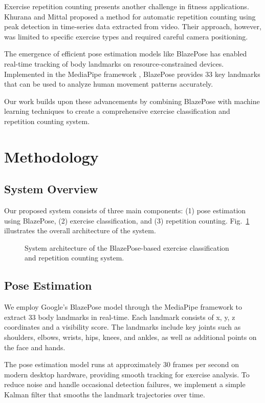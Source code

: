 \documentclass[conference]{IEEEtran}
\begin{document}
Exercise repetition counting presents another challenge in fitness applications. Khurana and Mittal \cite{rep_counting} proposed a method for automatic repetition counting using peak detection in time-series data extracted from video. Their approach, however, was limited to specific exercise types and required careful camera positioning.

The emergence of efficient pose estimation models like BlazePose \cite{blazepose} has enabled real-time tracking of body landmarks on resource-constrained devices. Implemented in the MediaPipe framework \cite{mediapipe}, BlazePose provides 33 key landmarks that can be used to analyze human movement patterns accurately.

Our work builds upon these advancements by combining BlazePose with machine learning techniques to create a comprehensive exercise classification and repetition counting system.

\section{Methodology}
\subsection{System Overview}
Our proposed system consists of three main components: (1) pose estimation using BlazePose, (2) exercise classification, and (3) repetition counting. Fig.~\ref{fig:system_architecture} illustrates the overall architecture of the system.

\begin{figure}[ht]
\centering

\caption{System architecture of the BlazePose-based exercise classification and repetition counting system.}
\label{fig:system_architecture}
\end{figure}

\subsection{Pose Estimation}
We employ Google's BlazePose model through the MediaPipe framework to extract 33 body landmarks in real-time. Each landmark consists of x, y, z coordinates and a visibility score. The landmarks include key joints such as shoulders, elbows, wrists, hips, knees, and ankles, as well as additional points on the face and hands.

The pose estimation model runs at approximately 30 frames per second on modern desktop hardware, providing smooth tracking for exercise analysis. To reduce noise and handle occasional detection failures, we implement a simple Kalman filter that smooths the landmark trajectories over time.
\end{document}
